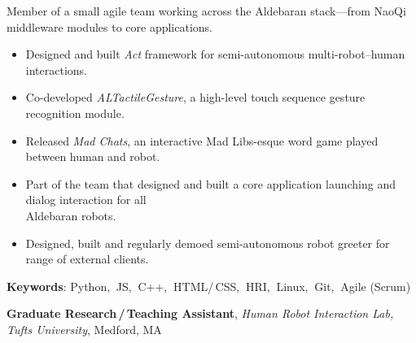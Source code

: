 \documentclass[10pt, letter]{article}
\newcommand{\years}[1]{\marginnote{\footnotesize #1}}
\newenvironment{desc*}{
  \begin{description}
    \setlength{\itemsep}{0.2pt}
    \setlength{\parskip}{-1pt}
    \setlength{\parsep}{0pt}
  }{
  \end{description}
}
\begin{document}
\vspace{-.3cm} 
Member of a small agile team working across the Aldebaran stack---from NaoQi middleware modules to core applications.
\begin{itemize}[leftmargin=*, parsep=-1pt]
\item Designed and built \textit{Act} framework for semi-autonomous
  multi-robot--human interactions.
\item Co-developed \textit{ALTactileGesture}, a high-level touch sequence
  gesture recognition module.
\item Released \textit{Mad Chats}, an interactive Mad Libs-esque word
  game played between human and robot.
\item Part of the team that designed and built a core
  application launching and dialog interaction for all\\
  Aldebaran robots.
\item Designed, built and regularly demoed semi-autonomous robot
  greeter for range of external clients.
\end{itemize}
\vspace{-.2cm}
\begin{desc*}
\item[\rm \color{redblue} \textbf{Keywords}:] Python,$\:$ JS,$\:$ C++,$\:$ HTML/\,CSS,$\:$
  HRI,$\:$ Linux,$\:$ Git,$\:$ Agile (Scrum)\bigbreak
\end{desc*}

\years{2012 - 2014} 
\textbf{\fontsize{10.5pt}{1em}\selectfont Graduate Research\,/\,Teaching Assistant}, 
\textit{Human Robot Interaction Lab, Tufts University}, Medford, MA\bigskip
\end{document}
